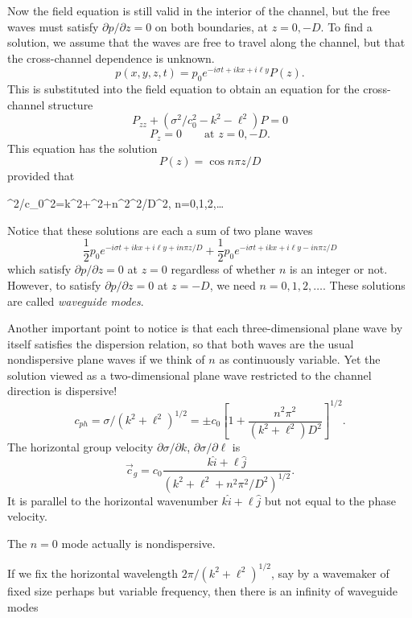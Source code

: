 Now the field equation is still valid in the interior of the channel, but the free waves
must satisfy $\partial p/\partial z=0$ on both boundaries, at $z=0,-D$. To find a
solution, we assume that the waves are free to travel along the channel, but that the
cross-channel dependence is unknown.
\[
	p(x,y,z,t)=p_0e^{-i\sigma t+ikx+i\ell y}P(z).
\]
This is substituted into the field equation to obtain an equation for the cross-channel
structure
\[
	P_{zz}+(\sigma^2/c_0^2-k^2-\ell^2)P=0
\]
\[
	P_z=0\qquad\text{at }z=0,-D.
\]
This equation has the solution
\[
	P(z)=\cos n\pi z/D
\]
provided that
\begin{waveequation}
	\sigma^2/c_0^2=k^2+\ell^2+n^2\pi^2/D^2,
	\qquad n=0,1,2,\ldots
\end{waveequation}

\sourcepagebreak

Notice that these solutions are each a sum of two plane waves
\[
	\frac12p_0e^{-i\sigma t+ikx+i\ell y+in\pi z/D}
	+\frac12p_0e^{-i\sigma t+ikx+i\ell y-in\pi z/D}
\]
which satisfy $\partial p/\partial z=0$ at $z=0$ regardless of whether $n$ is an integer
or not. However, to satisfy $\partial p/\partial z=0$ at $z=-D$, we need
$n=0,1,2,\ldots$. These solutions are called \emph{waveguide modes}.

Another important point to notice is that each three-dimensional plane wave by itself
satisfies the dispersion relation, so that both waves are the usual nondispersive plane
waves if we think of $n$ as continuously variable. Yet the solution viewed as a
two-dimensional plane wave restricted to the channel direction is dispersive!
\[
	c_{ph}=\sigma/(k^2+\ell^2)^{1/2}
	=\pm c_0\left[1+\frac{n^2\pi^2}{(k^2+\ell^2)D^2}\right]^{1/2}.
\]
The horizontal group velocity $\partial\sigma/\partial k$, $\partial\sigma/\partial\ell$ is
\[
	\vec c_g
	=c_0\frac{k\hat i+\ell\hat j}
	{(k^2+\ell^2+n^2\pi^2/D^2)^{1/2}}.
\]
It is parallel to the horizontal wavenumber $k\hat i+\ell\hat j$ but not equal to the
phase velocity.


The $n=0$ mode actually is nondispersive.

If we fix the horizontal wavelength $2\pi/(k^2+\ell^2)^{1/2}$, say by a wavemaker of
fixed size perhaps but variable frequency, then there is an infinity of waveguide modes

